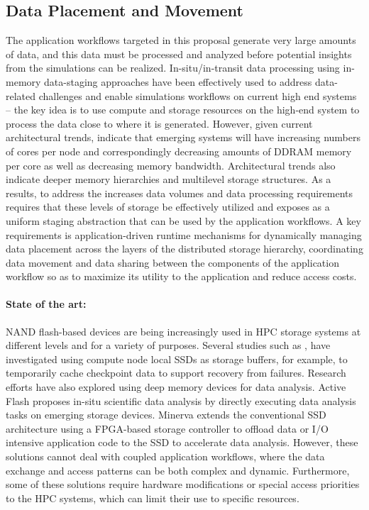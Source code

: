 \subsection{Data Placement and Movement}

The application workflows targeted in this proposal generate very large amounts of data, and this data must be processed and analyzed before potential insights from the simulations can be realized. In-situ/in-transit data processing using in-memory data-staging approaches have been effectively used to address data-related challenges and enable simulations workflows on current high end systems -- the key idea is to use compute and storage resources on the high-end system to process the data close to where it is generated. However, given current architectural trends, indicate that emerging systems will have increasing numbers of cores per node and correspondingly decreasing amounts of DDRAM memory per core as well as decreasing memory bandwidth. Architectural trends also indicate deeper memory hierarchies and multilevel storage structures. As a results, to address the increases data volumes and data processing requirements requires that these levels of storage be effectively utilized and exposes as a uniform staging abstraction that can be used by the application workflows.  A key requirements is application-driven runtime mechanisms for dynamically managing data placement across the layers of the distributed storage hierarchy, coordinating data movement and data sharing between the components of the application workflow so as to maximize its utility to the application and reduce access costs. 

\paragraph{State of the art:} NAND flash-based devices are being increasingly used in HPC storage systems at different levels and for a variety of purposes. Several studies such as \cite{multitier}, \cite{sc10li} have investigated using compute node local SSDs as storage buffers, for example, to temporarily cache checkpoint data to support recovery from failures. Research efforts have also explored using deep memory devices for data analysis. Active Flash \cite{activeflash} proposes in-situ scientific data analysis by directly executing data analysis tasks on emerging storage devices. Minerva \cite{minerva} extends the conventional SSD architecture using a FPGA-based storage controller to offload data or I/O intensive application code to the SSD to accelerate data analysis. However, these solutions cannot deal with coupled application workflows, where the data exchange and access patterns can be both complex and dynamic. Furthermore, some of these solutions require hardware modifications or special access priorities to the HPC systems, which can limit their use to specific resources.


